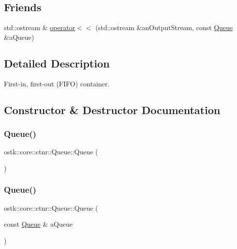 \subsection*{Friends}
\begin{DoxyCompactItemize}
\item 
std\+::ostream \& \hyperlink{classostk_1_1core_1_1ctnr_1_1_queue_a4c174fae5388505f1109c3cf04974617}{operator$<$$<$} (std\+::ostream \&an\+Output\+Stream, const \hyperlink{classostk_1_1core_1_1ctnr_1_1_queue}{Queue} \&a\+Queue)
\end{DoxyCompactItemize}


\subsection{Detailed Description}
First-\/in, first-\/out (F\+I\+FO) container. 

\subsection{Constructor \& Destructor Documentation}
\mbox{\label{classostk_1_1core_1_1ctnr_1_1_queue_ad64a554616db74739cb15e9ac9e15cff}} 
\subsubsection{\texorpdfstring{Queue()}{Queue()}\hspace{0.1cm}{\footnotesize\ttfamily [1/2]}}
{\footnotesize\ttfamily ostk\+::core\+::ctnr\+::\+Queue\+::\+Queue (\begin{DoxyParamCaption}{ }\end{DoxyParamCaption})\hspace{0.3cm}{\ttfamily [delete]}}

\mbox{\label{classostk_1_1core_1_1ctnr_1_1_queue_aa502e0316077867910ecb429fe7c0ece}} 
\subsubsection{\texorpdfstring{Queue()}{Queue()}\hspace{0.1cm}{\footnotesize\ttfamily [2/2]}}
{\footnotesize\ttfamily ostk\+::core\+::ctnr\+::\+Queue\+::\+Queue (\begin{DoxyParamCaption}\item[{const \hyperlink{classostk_1_1core_1_1ctnr_1_1_queue}{Queue} \&}]{a\+Queue }\end{DoxyParamCaption})}


